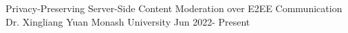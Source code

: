 

\begin{cvhonors}

   \cvhonor
   {Privacy-Preserving Server-Side Content Moderation over E2EE Communication}
   {Dr. Xingliang Yuan}
   {Monash University}
   {Jun 2022\newline - Present}

\end{cvhonors}
